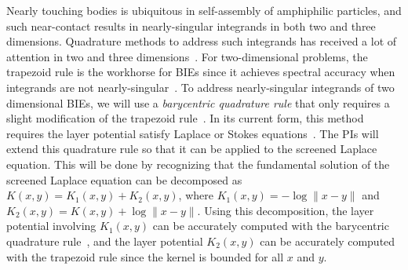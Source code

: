 Nearly touching bodies is ubiquitous in self-assembly of amphiphilic
particles, and such near-contact results in nearly-singular integrands
in both two and three dimensions. Quadrature methods to address such
integrands has received a lot of attention in two and three
dimensions~\cite{alpert, kapur, sidi, duffy, bruno1, bruno2, davis_1984,
graglia_2008, hackbusch_sauter_1994, jarvenpaa_2003, khayat_2005,
schwab_1992, ying_2006, beale1, beale2, goodman_1990, haroldson_1998,
lowengrub_1993, schwab_1992, ggq1, ggq2, ggq3, helsing_2008a,
helsing_integral_2009, helsing_tutorial_2012, klockner2013jcp, qbx2,
wala2019jcp, af2018sisc, siegel2018jcp, rachh2017jcp, ding2019arxiv,
bar2014}. For two-dimensional problems, the trapezoid rule is the
workhorse for BIEs since it achieves spectral accuracy when integrands
are not nearly-singular~\cite{tre-wei2014}. To address nearly-singular
integrands of two dimensional BIEs, we will use a {\em barycentric
quadrature rule} that only requires a slight modification of the
trapezoid rule~\cite{ioa-pap-per1991}. In its current form, this method
requires the layer potential satisfy Laplace or Stokes
equations~\cite{bar-wu-vee2015, chi-moo-qua2020}. The PIs will extend
this quadrature rule so that it can be applied to the screened Laplace
equation. This will be done by recognizing that the fundamental solution
of the screened Laplace equation can be decomposed as $K(x,y) = K_1(x,y)
+ K_2(x,y)$, where $K_1(x,y) = -\log\|x - y\|$ and $K_2(x,y) = K(x,y) +
\log\|x - y\|$. Using this decomposition, the layer potential involving
$K_1(x,y)$ can be accurately computed with the barycentric quadrature
rule~\cite{ioa-pap-per1991}, and the layer potential $K_2(x,y)$ can be
accurately computed with the trapezoid rule since the kernel is bounded
for all $x$ and $y$.

